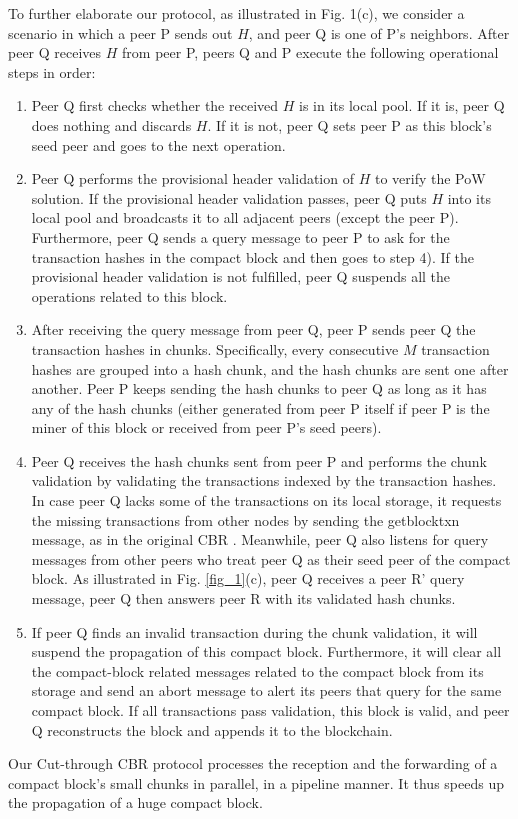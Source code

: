 \documentclass[10pt,journal,compsoc]{IEEEtran}
\begin{document}
To further elaborate our protocol, as illustrated in Fig. 1(c), we consider a scenario in which a peer P sends out $H$, and peer Q is one of P's neighbors. After peer Q receives $H$ from peer P, peers Q and P execute the following operational steps in order: 
\begin{enumerate}
\item Peer Q first checks whether the received $H$ is in its local pool. If it is, peer Q does nothing and discards $H$. If it is not, peer Q sets peer P as this block's seed peer and goes to the next operation.
\item Peer Q performs the provisional header validation of $H$ to verify the PoW solution. If the provisional header validation passes, peer Q puts $H$ into its local pool and broadcasts it to all adjacent peers (except the peer P). Furthermore, peer Q sends a query message to peer P to ask for the transaction hashes in the compact block and then goes to step 4). If the provisional header validation is not fulfilled, peer Q suspends all the operations related to this block.
\item After receiving the query message from peer Q, peer P sends peer Q the transaction hashes in chunks. Specifically, every consecutive $M$ transaction hashes are grouped into a hash chunk, and the hash chunks are sent one after another. Peer P keeps sending the hash chunks to peer Q as long as it has any of the hash chunks (either generated from peer P itself if peer P is the miner of this block or received from peer P's seed peers).
\item Peer Q receives the hash chunks sent from peer P and performs the chunk validation by validating the transactions indexed by the transaction hashes. In case peer Q lacks some of the transactions on its local storage, it requests the missing transactions from other nodes by sending the getblocktxn message, as in the original CBR \cite{corallo2017compact}. Meanwhile, peer Q also listens for query messages from other peers who treat peer Q as their seed peer of the compact block. As illustrated in Fig. \ref{fig_1}(c), peer Q receives a peer R' query message, peer Q then answers peer R with its validated hash chunks. 
\item If peer Q finds an invalid transaction during the chunk validation, it will suspend the propagation of this compact block. Furthermore, it will clear all the compact-block related messages related to the compact block from its storage and send an abort message to alert its peers that query for the same compact block. If all transactions pass validation, this block is valid, and peer Q reconstructs the block and appends it to the blockchain. 
\end{enumerate}
Our Cut-through CBR protocol processes the reception and the forwarding of a compact block's small chunks in parallel, in a pipeline manner. It thus speeds up the propagation of a huge compact block. 
\end{document}
